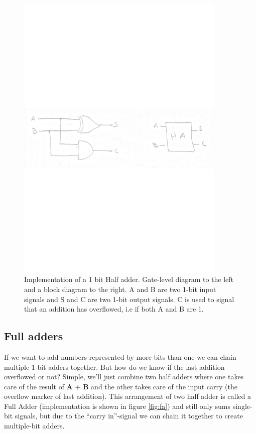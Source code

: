 \documentclass[a4paper,11pt]{report}
\begin{document}
\begin{figure}[H]
  \centering
  \includegraphics[width=10cm]{images/HA.pdf}
  \caption{Implementation of a 1 bit Half adder. Gate-level diagram to
    the left and a block diagram to the right. A and B are two 1-bit
    input signals and S and C are two 1-bit output signals. C is used
    to signal that an addition has overflowed, i.e if both A and B are
    1.}
  \label{fig:ha}
\end{figure}

\subsection{Full adders}

If we want to add numbers represented by more bits than one we can
chain multiple 1-bit adders together. But how do we know if the last
addition overflowed or not? Simple, we'll just combine two half adders
where one takes care of the result of \textbf{A} + \textbf{B} and the
other takes care of the input carry (the overflow marker of last
addition).  This arrangement of two half adder is called a Full Adder
(implementation is shown in figure \ref{fig:fa}) and still only sums
single-bit signals, but due to the ``carry in''-signal we can chain it
together to create multiple-bit adders.
\end{document}
